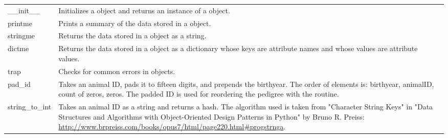 \begin{center}
    \tablelasttail{\hline}
    \label{tbl:objects-animal-objects-light-animal-methods}
    \begin{xtabular}{l|p{4in}}
        \_\_init\_\_ & Initializes a  object and returns an instance of a  object. \\
        printme & Prints a summary of the data stored in a  object. \\
        stringme & Returns the data stored in a  object as a string. \\
        dictme & Returns the data stored in a  object as a dictionary whose keys are attribute names and whose values are attribute values. \\
        trap & Checks for common errors in  objects. \\
        pad\_id & Takes an animal ID, pads it to fifteen digits, and prepends the birthyear. The order of elements is: birthyear, animalID, count of zeros, zeros. The padded ID is used for reordering the pedigree with the  routine. \\
        string\_to\_int & Takes an animal ID as a string and returns a hash. The algorithm used is taken from "Character String Keys" in "Data Structures and Algorithms with Object-Oriented Design Patterns in Python" by Bruno R. Preiss: \url{http://www.brpreiss.com/books/opus7/html/page220.html#progstrnga}. \\
    \end{xtabular}
\end{center}
